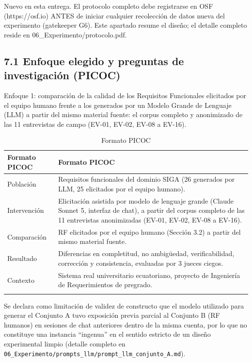 
Nuevo en esta entrega. El protocolo completo debe registrarse en OSF (https://osf.io) ANTES de iniciar cualquier recolección de datos nueva del experimento (gatekeeper G6). Este apartado resume el diseño; el detalle completo reside en 06\_Experimento/protocolo.pdf.


\subsection*{7.1 Enfoque elegido y preguntas de investigación (PICOC)}


Enfoque 1: comparación de la calidad de los Requisitos Funcionales elicitados por el equipo humano frente a los generados por un Modelo Grande de Lenguaje (LLM) a partir del mismo material fuente: el corpus completo y anonimizado de las 11 entrevistas de campo (EV-01, EV-02, EV-08 a EV-16).


\begingroup
\small
\begin{longtable}{|p{7.8cm}|p{7.8cm}|}
\hline
Formato PICOC & Formato PICOC \\ \hline
Población & Requisitos funcionales del dominio SIGA (26 generados por LLM, 25 elicitados por el equipo humano). \\ \hline
Intervención & Elicitación asistida por modelo de lenguaje grande (Claude Sonnet 5, interfaz de chat), a partir del corpus completo de las 11 entrevistas anonimizadas (EV-01, EV-02, EV-08 a EV-16). \\ \hline
Comparación & RF elicitados por el equipo humano (Sección 3.2) a partir del mismo material fuente. \\ \hline
Resultado & Diferencias en completitud, no ambigüedad, verificabilidad, corrección y consistencia, evaluadas por 3 jueces ciegos. \\ \hline
Contexto & Sistema real universitario ecuatoriano, proyecto de Ingeniería de Requerimientos de pregrado. \\ \hline
\caption{Formato PICOC}
\end{longtable}
\endgroup

Se declara como limitación de validez de constructo que el modelo utilizado para generar el Conjunto A tuvo exposición previa parcial al Conjunto B (RF humanos) en sesiones de chat anteriores dentro de la misma cuenta, por lo que no constituye una instancia ``ingenua'' en el sentido estricto de un diseño experimental limpio (detalle completo en \texttt{06\_Experimento/prompts\_llm/prompt\_llm\_conjunto\_A.md}).

